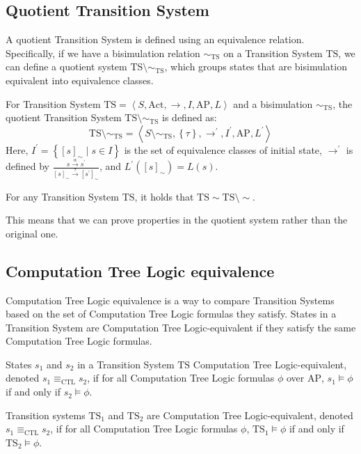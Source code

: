 \subsection{Quotient Transition System}
A quotient Transition System is defined using an equivalence relation. 
Specifically, if we have a bisimulation relation $\sim_{\text{TS}}$ on a Transition System $\text{TS}$, we can define a quotient system $\text{TS}\setminus\sim_{\text{TS}}$, which groups states that are bisimulation equivalent into equivalence classes.
\begin{definition}
    For Transition System $\text{TS}=\left\langle S,\text{Act},\rightarrow,I,\text{AP},L\right\rangle$ and a bisimulation $\sim_{\text{TS}}$, the quotient Transition System $\text{TS}\setminus\sim_{\text{TS}}$ is defined as:
    \[\text{TS}\setminus\sim_{\text{TS}}=\left\langle S\setminus\sim_{\text{TS}},\left\{\tau\right\},\rightarrow^\prime,I^\prime,\text{AP},L^\prime\right\rangle\]
    Here, $I^\prime=\left\{[s]_{\sim}\mid s \in I\right\}$ is the set of equivalence classes of initial state, $\rightarrow^\prime$ is defined by $\frac{s\xrightarrow{\alpha}s^\prime}{[s]_{\sim}\xrightarrow{\tau}[s^\prime]_{\sim}}$, and $L^\prime([s]_{\sim})=L(s)$.
\end{definition}
\begin{theorem}
    For any Transition System $\text{TS}$, it holds that $\text{TS}\sim\text{TS}\setminus\sim$. 
\end{theorem}
\noindent This means that we can prove properties in the quotient system rather than the original one.

\subsection{Computation Tree Logic equivalence}
Computation Tree Logic equivalence is a way to compare Transition Systems based on the set of Computation Tree Logic formulas they satisfy. 
States in a Transition System are Computation Tree Logic-equivalent if they satisfy the same Computation Tree Logic formulas. 

\begin{definition}
    States $s_1$ and $s_2$ in a Transition System $\text{TS}$ Computation Tree Logic-equivalent, denoted $s_1 \equiv_{\text{CTL}} s_2$, if for all Computation Tree Logic formulas $\phi$ over $\text{AP}$, $s_1 \models \phi$ if and only if $s_2 \models \phi$.
\end{definition}
\begin{definition}
    Transition systems $\text{TS}_1$ and $\text{TS}_2$ are Computation Tree Logic-equivalent, denoted $s_1 \equiv_{\text{CTL}} s_2$, if for all Computation Tree Logic formulas $\phi$, $\text{TS}_1 \models \phi$ if and only if $\text{TS}_2 \models \phi$.
\end{definition}

